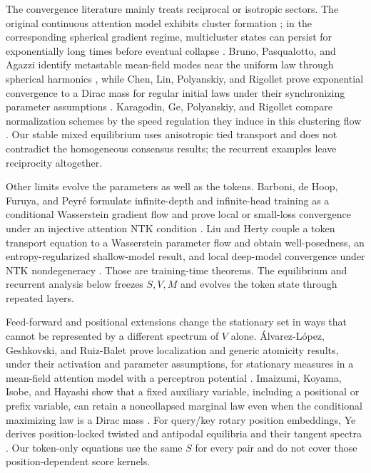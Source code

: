 \documentclass[11pt,a4paper]{article}
\theoremstyle{definition}
\begin{document}
The convergence literature mainly treats reciprocal or isotropic sectors.  The
original continuous attention model exhibits cluster formation
\cite{geshkovski2023clusters}; in the corresponding spherical gradient regime,
multicluster states can persist for exponentially long times before eventual collapse
\cite{geshkovski2024metastability}.  Bruno, Pasqualotto, and Agazzi identify
metastable mean-field modes near the uniform law through spherical harmonics
\cite{bruno2024metastable}, while Chen, Lin, Polyanskiy, and Rigollet prove
exponential convergence to a Dirac mass for regular initial laws under their
synchronizing parameter assumptions \cite{chen2025quantitative}.  Karagodin, Ge,
Polyanskiy, and Rigollet compare normalization schemes by the speed regulation they
induce in this clustering flow \cite{karagodin2025normalization}.  Our stable mixed
equilibrium uses anisotropic tied transport and does not contradict the homogeneous
consensus results; the recurrent examples leave reciprocity altogether.

Other limits evolve the parameters as well as the tokens.  Barboni, de Hoop, Furuya,
and Peyr\'e formulate infinite-depth and infinite-head training as a conditional
Wasserstein gradient flow and prove local or small-loss convergence under an
injective attention NTK condition \cite{barboni2026training}.  Liu and Herty couple a
token transport equation to a Wasserstein parameter flow and obtain well-posedness,
an entropy-regularized shallow-model result, and local deep-model convergence under
NTK nondegeneracy \cite{herty2026meanfield}.  Those are training-time theorems.  The
equilibrium and recurrent analysis below freezes $S,V,M$ and evolves the token state
through repeated layers.

Feed-forward and positional extensions change the stationary set in ways that cannot
be represented by a different spectrum of $V$ alone.  \'Alvarez-L\'opez, Geshkovski,
and Ruiz-Balet prove localization and generic atomicity results, under their
activation and parameter assumptions, for stationary measures in a mean-field
attention model with a perceptron potential
\cite{alvarezlopez2026perceptrons}.  Imaizumi, Koyama, Isobe, and Hayashi show that a
fixed auxiliary variable, including a positional or prefix variable, can retain a
noncollapsed marginal law even when the conditional maximizing law is a Dirac mass
\cite{imaizumi2026anticollapse}.  For query/key rotary position embeddings, Ye derives
position-locked twisted and antipodal equilibria and their tangent spectra
\cite{ye2026rope}.  Our token-only equations use the same $S$ for every pair and do
not cover those position-dependent score kernels.
\end{document}
